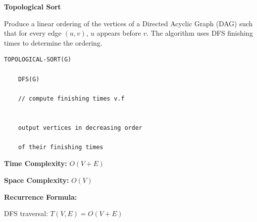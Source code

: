 \documentclass[a4paper,12pt]{article}
\begin{document}
\begin{tcolorbox}[
    colback=gray!30,
    colframe=black,
    boxrule=1pt,
    arc=0mm
]

\begin{tcolorbox}[
    colback=gray!10,
    colframe=black,
    arc=0mm
]
\centering
{\Huge\bfseries Topological Sort}
\end{tcolorbox}


\begin{tcolorbox}[
    colback=gray!10,
    colframe=black,
    arc=0mm
]
\small
Produce a linear ordering of the vertices of a Directed Acyclic Graph (DAG)
such that for every edge $(u,v)$, $u$ appears before $v$.
The algorithm uses DFS finishing times to determine the ordering.
\end{tcolorbox}


\begin{tcolorbox}[
    colback=black!5,
    colframe=black,
    arc=0mm,
    title=Pseudo-code
]
\tiny
\begin{lstlisting}
TOPOLOGICAL-SORT(G)

    DFS(G)

    // compute finishing times v.f


    output vertices in decreasing order

    of their finishing times
\end{lstlisting}
\end{tcolorbox}


\begin{tcolorbox}[
    colback=cyan!20,
    colframe=black,
    arc=0mm
]
\small
\textbf{Time Complexity:}
$O(V+E)$
\end{tcolorbox}


\begin{tcolorbox}[
    colback=violet!20,
    colframe=black,
    arc=0mm
]
\small
\textbf{Space Complexity:}
$O(V)$
\end{tcolorbox}


\begin{tcolorbox}[
    colback=pink!20,
    colframe=black,
    arc=0mm
]
\small
\textbf{Recurrence Formula:}

DFS traversal:
$T(V,E)=O(V+E)$
\end{tcolorbox}

\end{tcolorbox}
\end{document}
